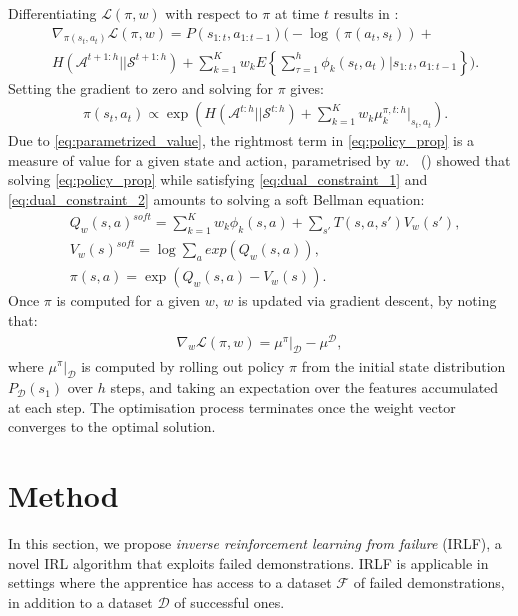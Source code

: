 \documentclass[letterpaper]{article}
\newcommand{\citet}[1]{\citeauthor{#1}~(\citeyear{#1})}
\begin{document}
Differentiating $\mathcal{L}(\pi,w)$ with respect to $\pi$ at time $t$ results in \cite[p.\ 186]{ziebart2010modelingthesis}:
\begin{equation}
 \begin{split}
 &\nabla_{\pi(s_t,a_t)}\mathcal{L}(\pi,w) = P(s_{1:t},a_{1:t-1})\Bigg(-\log(\pi(a_t,s_t))+ \\
& H(\mathcal{A}^{t+1:h}||\mathcal{S}^{t+1:h})
 +\sum_{k=1}^K w_kE\left\{\sum_{\tau=1}^h \phi_k(s_t,a_t)|s_{1:t},a_{1:t-1}\right\}\Bigg). \label{eqn:zieb_lagragian_derivative}
 \end{split}
\end{equation}
Setting the gradient to zero and solving for $\pi$ gives:
\begin{equation}
\label{eq:policy_prop}
	\begin{split}
	&\pi(s_t,a_t) \propto \exp\left(H(\mathcal{A}^{t:h}||\mathcal{S}^{t:h})+\sum^K_{k=1} w_k\mu_k^{\pi,t:h}|_{s_t,a_t}\right).
	\end{split}
\end{equation}
Due to \eqref{eq:parametrized_value}, the rightmost term in \eqref{eq:policy_prop} is a measure of value for a given state and action, parametrised by $w$. \citet{ziebart2010modelingthesis} showed that solving \eqref{eq:policy_prop} while satisfying \eqref{eq:dual_constraint_1} and \eqref{eq:dual_constraint_2} amounts to solving a soft Bellman equation:
	\begin{equation}
		\begin{split}
	&Q_w(s,a)^{soft} = \sum_{k=1}^Kw_k\phi_k(s,a) + \sum_{s'}T(s,a,s')V_w(s'),\\	
	&V_w(s)^{soft} = \log\sum_{a}exp(Q_w(s,a)),\\
	&\pi(s,a) = \exp(Q_w(s,a) - V_w(s)).
	\end{split}
	\label{eq:soft_backup}
	\end{equation}
Once $\pi$ is computed for a given $w$, $w$ is updated via gradient descent, by noting that:
 \begin{align}
   \label{eq:weight_update}
   \nabla_{w}\mathcal{L}(\pi,w) =\mu^\pi|_{\mathcal{D}} - \mu^{\mathcal{D}},
 \end{align}
where $\mu^\pi|_{\mathcal{D}}$ is computed by rolling out policy $\pi$ from the initial state distribution $P_{\mathcal{D}}(s_1)$ over $h$ steps, and taking an expectation over the features accumulated at each step. The optimisation process terminates once the weight vector converges to the optimal solution.

\section{Method}
In this section, we propose \emph{inverse reinforcement learning from failure} (IRLF), a novel IRL algorithm that exploits failed demonstrations.  IRLF is applicable in settings where the apprentice has access to a dataset $\mathcal{F}$ of failed demonstrations, in addition to a dataset $\mathcal{D}$ of successful ones.
\end{document}
